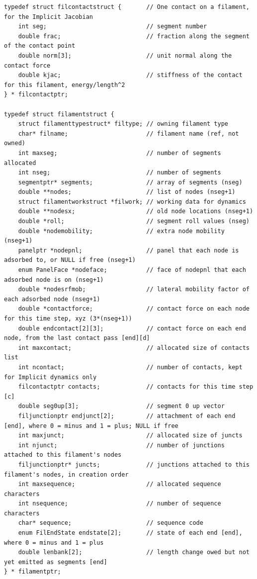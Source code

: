 \documentclass {scrbook}
\begin{document}
\begin{lstlisting}
typedef struct filcontactstruct {       // One contact on a filament, for the Implicit Jacobian
    int seg;                            // segment number
    double frac;                        // fraction along the segment of the contact point
    double norm[3];                     // unit normal along the contact force
    double kjac;                        // stiffness of the contact for this filament, energy/length^2
} * filcontactptr;

typedef struct filamentstruct {
    struct filamenttypestruct* filtype; // owning filament type
    char* filname;                      // filament name (ref, not owned)
    int maxseg;                         // number of segments allocated
    int nseg;                           // number of segments
    segmentptr* segments;               // array of segments (nseg)
    double **nodes;                     // list of nodes (nseg+1)
    struct filamentworkstruct *filwork; // working data for dynamics
    double **nodesx;                    // old node locations (nseg+1)
    double *roll;                       // segment roll values (nseg)
    double *nodemobility;               // extra node mobility (nseg+1)
    panelptr *nodepnl;                  // panel that each node is adsorbed to, or NULL if free (nseg+1)
    enum PanelFace *nodeface;           // face of nodepnl that each adsorbed node is on (nseg+1)
    double *nodesrfmob;                 // lateral mobility factor of each adsorbed node (nseg+1)
    double *contactforce;               // contact force on each node for this time step, xyz (3*(nseg+1))
    double endcontact[2][3];            // contact force on each end node, from the last contact pass [end][d]
    int maxcontact;                     // allocated size of contacts list
    int ncontact;                       // number of contacts, kept for Implicit dynamics only
    filcontactptr contacts;             // contacts for this time step [c]
    double seg0up[3];                   // segment 0 up vector
    filjunctionptr endjunct[2];         // attachment of each end [end], where 0 = minus and 1 = plus; NULL if free
    int maxjunct;                       // allocated size of juncts
    int njunct;                         // number of junctions attached to this filament's nodes
    filjunctionptr* juncts;             // junctions attached to this filament's nodes, in creation order
    int maxsequence;                    // allocated sequence characters
    int nsequence;                      // number of sequence characters
    char* sequence;                     // sequence code
    enum FilEndState endstate[2];       // state of each end [end], where 0 = minus and 1 = plus
    double lenbank[2];                  // length change owed but not yet emitted as segments [end]
} * filamentptr;
\end{lstlisting}
\end{document}
